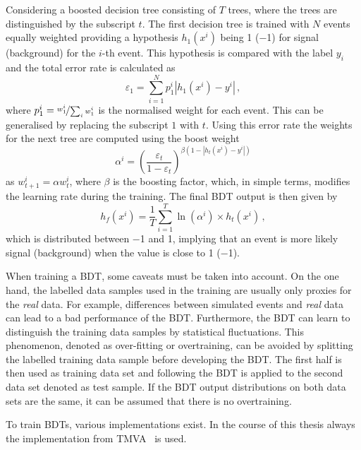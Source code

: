 Considering a boosted decision tree consisting of $T$ trees, where the trees are distinguished by the subscript $t$.
The first decision tree is trained with $N$ events equally weighted providing a hypothesis $h_1(x^i)$ being \num{+1} (\num{-1}) for signal (background) for the $i$-th event.
This hypothesis is compared with the label $y_i$ and the total error rate is calculated as
\begin{equation}
\varepsilon_1=\sum_{i=1}^{N}p^i_1\left|h_1(x^i)-y^i\right|\,,
\end{equation}
where $p_1^i=\nicefrac{w_1^i}{\sum_{i}w_1^i}$ is the normalised weight for each event.
This can be generalised by replacing the subscript $1$ with $t$.
Using this error rate the weights for the next tree are computed using the boost weight
\begin{equation}
\alpha^i=\left(\frac{\varepsilon_t}{1-\varepsilon_t}\right)^{\beta\left(1-\left|h_t(x^i)-y^i\right|\right)}
\end{equation}
as $w_{t+1}^i=\alpha w_t^i$, where $\beta$ is the boosting factor,  which, in simple terms, modifies the learning rate during the training.
The final BDT output is then given by
\begin{equation}
h_f(x^i)=\frac{1}{T}\sum_{i=1}^{T}\ln\left(\alpha^i\right)\times h_t(x^i)\,,
\end{equation}
which is distributed between \num{-1} and \num{+1}, implying that an event is more likely signal (background) when the value is close to \num{+1} (\num{-1}).

When training a \ac{BDT}, some caveats must be taken into account.
On the one hand, the labelled data samples used in the training are usually only proxies for the \emph{real} data.
For example, differences between simulated events and \emph{real} data can lead to a bad performance of the \ac{BDT}.
Furthermore, the \ac{BDT} can learn to distinguish the training data samples by statistical fluctuations.
This phenomenon, denoted as over-fitting or overtraining, can be avoided by splitting the labelled training data sample before developing the \ac{BDT}.
The first half is then used as training data set and following the \ac{BDT} is applied to the second data set denoted as test sample.
If the \ac{BDT} output distributions on both data sets are the same, it can be assumed that there is no overtraining.

To train \ac{BDT}s, various implementations exist.
In the course of this thesis always the implementation from TMVA~\cite{Hocker:2007ht} is used.


